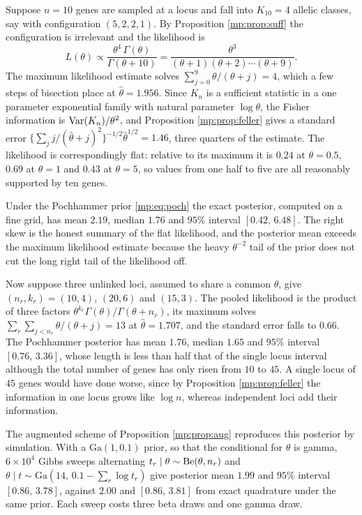 \begin{example}
\label{mp:ex:theta10}
Suppose $n=10$ genes are sampled at a locus and fall into $K_{10}=4$ allelic classes, say
with configuration $(5,2,2,1)$. By Proposition \ref{mp:prop:suff} the configuration is
irrelevant and the likelihood is
\[
L(\theta)\propto\frac{\theta^4\,\Gamma(\theta)}{\Gamma(\theta+10)}
=\frac{\theta^{3}}{(\theta+1)(\theta+2)\cdots(\theta+9)} .
\]
The maximum likelihood estimate solves $\sum_{j=0}^{9}\theta/(\theta+j)=4$, which a few steps
of bisection place at $\hat\theta=1.956$. Since $K_n$ is a sufficient statistic in a one
parameter exponential family with natural parameter $\log\theta$, the Fisher information
is $\mathrm{Var}(K_n)/\theta^2$, and Proposition \ref{mp:prop:feller} gives a standard error
$\{\sum_j j/(\hat\theta+j)^2\}^{-1/2}\hat\theta^{1/2}=1.46$, three quarters of the estimate.
The likelihood is correspondingly flat: relative to its maximum it is $0.24$ at
$\theta=0.5$, $0.69$ at $\theta=1$ and $0.43$ at $\theta=5$, so values from one half to five
are all reasonably supported by ten genes.

Under the Pochhammer prior \eqref{mp:eq:poch} the exact posterior, computed on a fine grid,
has mean $2.19$, median $1.76$ and $95\%$ interval $[0.42,\,6.48]$. The right skew is the
honest summary of the flat likelihood, and the posterior mean exceeds the maximum
likelihood estimate because the heavy $\theta^{-2}$ tail of the prior does not cut the long
right tail of the likelihood off.
\end{example}

\begin{example}
\label{mp:ex:theta3}
Now suppose three unlinked loci, assumed to share a common $\theta$, give
$(n_r,k_r)=(10,4)$, $(20,6)$ and $(15,3)$. The pooled likelihood is the product of three
factors $\theta^{k_r}\Gamma(\theta)/\Gamma(\theta+n_r)$, its maximum solves
$\sum_r\sum_{j<n_r}\theta/(\theta+j)=13$ at $\hat\theta=1.707$, and the standard error falls
to $0.66$. The Pochhammer posterior has mean $1.76$, median $1.65$ and $95\%$ interval
$[0.76,\,3.36]$, whose length is less than half that of the single locus interval although
the total number of genes has only risen from $10$ to $45$. A single locus of $45$ genes
would have done worse, since by Proposition \ref{mp:prop:feller} the information in one
locus grows like $\log n$, whereas independent loci add their information.

The augmented scheme of Proposition \ref{mp:prop:aug} reproduces this posterior by
simulation. With a $\mathrm{Ga}(1,0.1)$ prior, so that the conditional for $\theta$ is
gamma, $6\times10^4$ Gibbs sweeps alternating $t_r\mid\theta\sim\mathrm{Be}(\theta,n_r)$ and
$\theta\mid t\sim\mathrm{Ga}(14,\,0.1-\sum_r\log t_r)$ give posterior mean $1.99$ and $95\%$
interval $[0.86,\,3.78]$, against $2.00$ and $[0.86,\,3.81]$ from exact quadrature under the
same prior. Each sweep costs three beta draws and one gamma draw.
\end{example}


